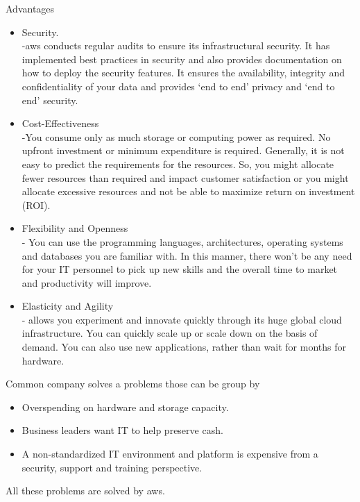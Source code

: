 \documentclass[thesis=M,english]{FITthesis}[2012/06/26]
\begin{document}
Advantages\cite{ml_aws_advantages} 
\begin{itemize}[nosep]
	\item Security.\\
-\acrshort{aws} conducts regular audits to ensure its infrastructural security. It has implemented best practices in security and also provides documentation on how to deploy the security features. It ensures the availability, integrity and confidentiality of your data and provides ‘end to end’ privacy and ‘end to end’ security.
	\item Cost-Effectiveness\\
-You consume only as much storage or computing power as required. No upfront investment or minimum expenditure is required. Generally, it is not easy to predict the requirements for the resources. So, you might allocate fewer resources than required and impact customer satisfaction or you might allocate excessive resources and not be able to maximize return on investment (ROI).
	\item Flexibility and Openness\\
- You can use the programming languages, architectures, operating systems and databases you are familiar with. In this manner, there won’t be any need for your IT personnel to pick up new skills and the overall time to market and productivity will improve. 
	\item Elasticity and Agility\\
- allows you experiment and innovate quickly through its huge global cloud infrastructure. You can quickly scale up or scale down on the basis of demand. You can also use new applications, rather than wait for months for hardware.\\
\end{itemize}

Common company solves a problems those can be group by\cite{ml_aws_benefits}
\begin{itemize}[nosep]
\item Overspending on hardware and storage capacity. 
\item Business leaders want IT to help preserve cash. 
\item A non-standardized IT environment and platform is expensive from a  security, support and training perspective.\\
\end{itemize}

All these problems are solved by \acrshort{aws}.\\
\end{document}
